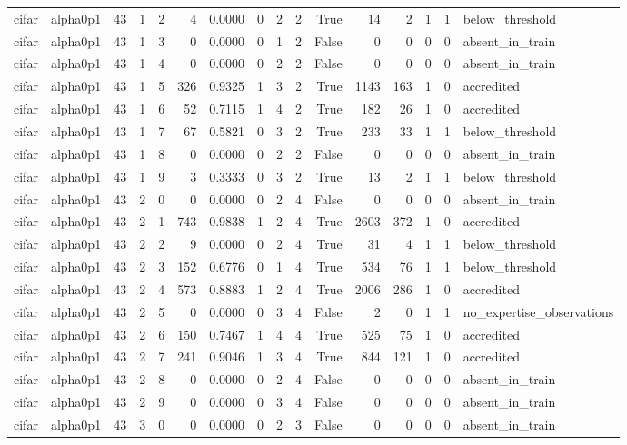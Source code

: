 \begin{tabular}{llrrrrrrrrrrrrrl}
cifar & alpha0p1 & 43 & 1 & 2 & 4 & 0.0000 & 0 & 2 & 2 & True & 14 & 2 & 1 & 1 & below\_threshold \\
cifar & alpha0p1 & 43 & 1 & 3 & 0 & 0.0000 & 0 & 1 & 2 & False & 0 & 0 & 0 & 0 & absent\_in\_train \\
cifar & alpha0p1 & 43 & 1 & 4 & 0 & 0.0000 & 0 & 2 & 2 & False & 0 & 0 & 0 & 0 & absent\_in\_train \\
cifar & alpha0p1 & 43 & 1 & 5 & 326 & 0.9325 & 1 & 3 & 2 & True & 1143 & 163 & 1 & 0 & accredited \\
cifar & alpha0p1 & 43 & 1 & 6 & 52 & 0.7115 & 1 & 4 & 2 & True & 182 & 26 & 1 & 0 & accredited \\
cifar & alpha0p1 & 43 & 1 & 7 & 67 & 0.5821 & 0 & 3 & 2 & True & 233 & 33 & 1 & 1 & below\_threshold \\
cifar & alpha0p1 & 43 & 1 & 8 & 0 & 0.0000 & 0 & 2 & 2 & False & 0 & 0 & 0 & 0 & absent\_in\_train \\
cifar & alpha0p1 & 43 & 1 & 9 & 3 & 0.3333 & 0 & 3 & 2 & True & 13 & 2 & 1 & 1 & below\_threshold \\
cifar & alpha0p1 & 43 & 2 & 0 & 0 & 0.0000 & 0 & 2 & 4 & False & 0 & 0 & 0 & 0 & absent\_in\_train \\
cifar & alpha0p1 & 43 & 2 & 1 & 743 & 0.9838 & 1 & 2 & 4 & True & 2603 & 372 & 1 & 0 & accredited \\
cifar & alpha0p1 & 43 & 2 & 2 & 9 & 0.0000 & 0 & 2 & 4 & True & 31 & 4 & 1 & 1 & below\_threshold \\
cifar & alpha0p1 & 43 & 2 & 3 & 152 & 0.6776 & 0 & 1 & 4 & True & 534 & 76 & 1 & 1 & below\_threshold \\
cifar & alpha0p1 & 43 & 2 & 4 & 573 & 0.8883 & 1 & 2 & 4 & True & 2006 & 286 & 1 & 0 & accredited \\
cifar & alpha0p1 & 43 & 2 & 5 & 0 & 0.0000 & 0 & 3 & 4 & False & 2 & 0 & 1 & 1 & no\_expertise\_observations \\
cifar & alpha0p1 & 43 & 2 & 6 & 150 & 0.7467 & 1 & 4 & 4 & True & 525 & 75 & 1 & 0 & accredited \\
cifar & alpha0p1 & 43 & 2 & 7 & 241 & 0.9046 & 1 & 3 & 4 & True & 844 & 121 & 1 & 0 & accredited \\
cifar & alpha0p1 & 43 & 2 & 8 & 0 & 0.0000 & 0 & 2 & 4 & False & 0 & 0 & 0 & 0 & absent\_in\_train \\
cifar & alpha0p1 & 43 & 2 & 9 & 0 & 0.0000 & 0 & 3 & 4 & False & 0 & 0 & 0 & 0 & absent\_in\_train \\
cifar & alpha0p1 & 43 & 3 & 0 & 0 & 0.0000 & 0 & 2 & 3 & False & 0 & 0 & 0 & 0 & absent\_in\_train \\

\end{tabular}
